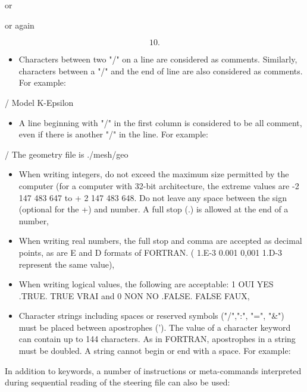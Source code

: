 
or


or again

\[10.\]

\begin{itemize}
\item Characters between two "/" on a line are considered as comments.
Similarly, characters between a "/" and the end of line are also considered as
comments.
For example:
\end{itemize}

      / Model K-Epsilon

\begin{itemize}
\item A line beginning with "/" in the first column is considered to be all
comment, even if there is another "/" in the line. For example:
\end{itemize}

 / The geometry file is ./mesh/geo

\begin{itemize}
\item When writing integers, do not exceed the maximum size permitted by the
computer (for a computer with 32-bit architecture, the extreme values are
-2 147 483 647 to + 2 147 483 648.
Do not leave any space between the sign (optional for the +) and number.
A full stop (.) is allowed at the end of a number,

\item When writing real numbers, the full stop and comma are accepted
as decimal points, as are E and D formats of FORTRAN.
( 1.E-3  0.001  0,001  1.D-3 represent the same value),

\item When writing logical values, the following are acceptable:
1 OUI  YES  .TRUE.  TRUE  VRAI and 0 NON  NO  .FALSE.  FALSE  FAUX,

\item Character strings including spaces or reserved symbols
("/",":", "=", "\&") must be placed between apostrophes (').
The value of a character keyword can contain up to 144 characters.
As in FORTRAN, apostrophes in a string must be doubled.
A string cannot begin or end with a space. For example:
\end{itemize}


In addition to keywords, a number of instructions or meta-commands interpreted
during sequential reading of the steering file can also be used:

